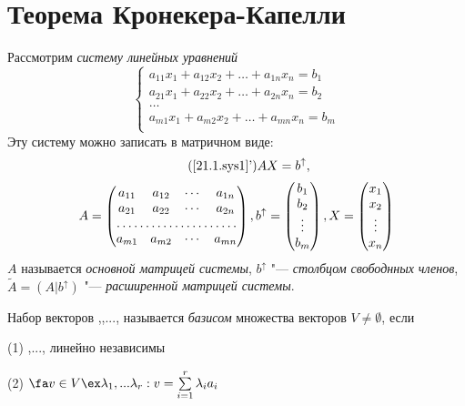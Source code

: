 \section{Теорема Кронекера-Капелли}
  Рассмотрим \textit{систему линейных уравнений}
  \begin{equation}\label{21.1.sys1}
  \left\lbrace\begin{array}{crl}
  a_{11}x_1+a_{12}x_2+\ldots+a_{1n}x_n=b_1\\
  a_{21}x_1+a_{22}x_2+\ldots+a_{2n}x_n=b_2\\
  \ldots \\
  a_{m1}x_1+a_{m2}x_2+\ldots+a_{mn}x_n=b_m\\ 
  \end{array}\right.\end{equation}
  Эту систему можно записать в матричном виде:
  \begin{equation*}\tag{\ref{21.1.sys1}'}
  AX=b^{\uparrow},
  \end{equation*}
  \begin{equation*}
  A=\begin{pmatrix}
    a_{11} & a_{12} & \cdots & a_{1n} \\
    a_{21} & a_{22} & \cdots & a_{2n} \\
    \hdotsfor{4} \\
    a_{m1} & a_{m2} & \cdots & a_{mn} \\
    \end{pmatrix},
  b^\uparrow=\begin{pmatrix}
    b_1 \\ b_2 \\ \vdots \\ b_m \\
    \end{pmatrix},
  X=\begin{pmatrix}
    x_1 \\ x_2 \\ \vdots \\ x_n \\
    \end{pmatrix}
  \end{equation*}
  $A$ называется \textit{основной матрицей системы}, $b^\uparrow$ "--- \textit{столбцом свободнных членов}, $\widetilde A = (A|b^\uparrow)$ "--- \textit{расширенной матрицей системы}.
  \begin{defn}
  Набор векторов ,,..., называется \textit{базисом} множества векторов $V\neq \emptyset$, если
  
  (1) ,..., линейно независимы
  
  (2) $\fa v \in V \ex \lambda_1,...\lambda_r: v=\sum \limits_{i=1}^r\lambda_ia_i$
  \end{defn}
  
